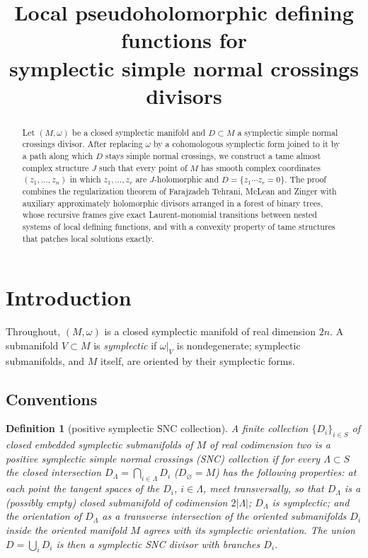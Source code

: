 \documentclass[12pt]{article}
\title{Local pseudoholomorphic defining functions for\\ symplectic simple normal crossings divisors}
\author{}
\date{}
\newtheorem{definition}[theorem]{Definition}
\theoremstyle{remark}
\begin{document}
\maketitle

\begin{abstract}
Let $(M,\omega)$ be a closed symplectic manifold and $D\subset M$ a
symplectic simple normal crossings divisor. After replacing $\omega$ by
a cohomologous symplectic form joined to it by a path along which $D$
stays simple normal crossings, we construct a tame almost complex
structure $J$ such that every point of $M$ has smooth complex
coordinates $(z_1,\dots,z_n)$ in which $z_1,\dots,z_r$ are
$J$-holomorphic and $D=\{z_1\cdots z_r=0\}$. The proof combines the
regularization theorem of Farajzadeh Tehrani, McLean and Zinger with
auxiliary approximately holomorphic divisors arranged in a forest of
binary trees, whose recursive frames give exact Laurent-monomial
transitions between nested systems of local defining functions, and
with a convexity property of tame structures that patches local
solutions exactly.
\end{abstract}

\section{Introduction}

Throughout, $(M,\omega)$ is a closed symplectic manifold of real
dimension $2n$. A submanifold $V\subset M$ is \emph{symplectic} if
$\omega|_V$ is nondegenerate; symplectic submanifolds, and $M$ itself,
are oriented by their symplectic forms.

\subsection*{Conventions}

\begin{definition}[positive symplectic SNC collection]\label{def:snc}
A finite collection $\{D_i\}_{i\in S}$ of closed embedded symplectic
submanifolds of $M$ of real codimension two is a \emph{positive
symplectic simple normal crossings (SNC) collection} if for every
$\Lambda\subset S$ the \emph{closed intersection}
$D_\Lambda=\bigcap_{i\in\Lambda}D_i$ ($D_\varnothing=M$) has the
following properties: at each point the tangent spaces of the $D_i$,
$i\in\Lambda$, meet transversally, so that $D_\Lambda$ is a (possibly
empty) closed submanifold of codimension $2|\Lambda|$; $D_\Lambda$ is
symplectic; and the orientation of $D_\Lambda$ as a transverse
intersection of the oriented
submanifolds $D_i$ inside the oriented manifold $M$ agrees with its
symplectic orientation. The union $D=\bigcup_iD_i$ is then a
\emph{symplectic SNC divisor} with \emph{branches} $D_i$.
\end{definition}
\end{document}
